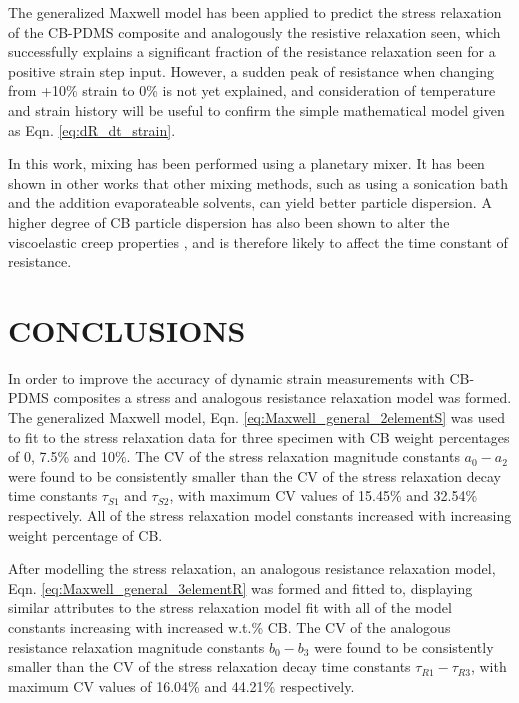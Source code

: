 The generalized Maxwell model has been applied to predict the stress relaxation of the CB-PDMS composite and analogously the resistive relaxation seen, which successfully explains a significant fraction of the resistance relaxation seen for a positive strain step input. However, a sudden peak of resistance when changing from +10\% strain to 0\% is not yet explained, and consideration of temperature and strain history\cite{Fung1993} will be useful to confirm the simple mathematical model given as Eqn. \ref{eq:dR_dt_strain}.

In this work, mixing has been performed using a planetary mixer. It has been shown in other works \cite{Xu2016,Spahr2017} that other mixing methods, such as using a sonication bath and the addition evaporateable solvents, can yield better particle dispersion. A higher degree of CB particle dispersion has also been shown to alter the viscoelastic creep properties \cite{Xu2016}, and is therefore likely to affect the time constant of resistance.


\section*{CONCLUSIONS}
In order to improve the accuracy of dynamic strain measurements with CB-PDMS composites a stress and analogous resistance relaxation model was formed. The generalized Maxwell model, Eqn. \ref{eq:Maxwell_general_2elementS} was used to fit to the stress relaxation data for three specimen with CB weight percentages of 0, 7.5\% and 10\%. The CV of the stress relaxation magnitude constants $a_0-a_2$ were found to be consistently smaller than the CV of the stress relaxation decay time constants $\tau_{S1}$ and $\tau_{S2}$, with maximum CV values of 15.45\% and 32.54\% respectively. All of the stress relaxation model constants increased with increasing weight percentage of CB.

After modelling the stress relaxation, an analogous resistance relaxation model, Eqn. \ref{eq:Maxwell_general_3elementR} was formed and fitted to, displaying similar attributes to the stress relaxation model fit with all of the model constants increasing with increased w.t.\% CB. The CV of the analogous resistance relaxation magnitude constants $b_0-b_3$ were found to be consistently smaller than the CV of the stress relaxation decay time constants $\tau_{R1}-\tau_{R3}$, with maximum CV values of 16.04\% and 44.21\% respectively.

